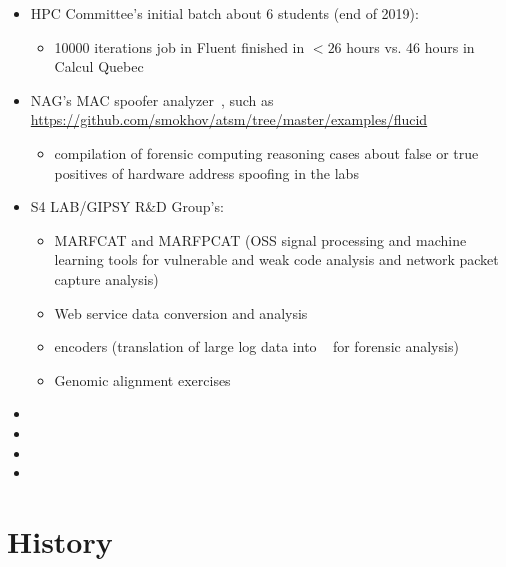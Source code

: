 \documentclass{easychair}
\begin{document}
\begin{itemize}
	\item 
HPC Committee's initial batch about 6 students (end of 2019):
\begin{itemize}
	\item 
10000 iterations job in Fluent finished in $<26$ hours vs. 46 hours in Calcul Quebec
\end{itemize}
	\item 
NAG's MAC spoofer analyzer~\cite{mac-spoofer-analyzer-intro-c3s2e2014,mac-spoofer-analyzer-detail-fps2014},
such as \url{https://github.com/smokhov/atsm/tree/master/examples/flucid}
\begin{itemize}
	\item 
compilation of forensic computing reasoning cases about false or true positives of hardware address spoofing in the labs
\end{itemize}
	\item 
S4 LAB/GIPSY R\&D Group's:
\begin{itemize}
	\item 
MARFCAT and MARFPCAT (OSS signal processing and machine learning tools for 
vulnerable and weak code analysis and network packet capture
analysis)~\cite{marfcat-nlp-ai2014,marfcat-sate2010-nist,fingerprinting-mal-traffic}
	\item 
Web service data conversion and analysis
	\item 
{\flucid} encoders (translation of large log data into {\flucid}~\cite{mokhov-phd-thesis-2013} for forensic analysis)
	\item 
Genomic alignment exercises
\end{itemize}
\item
{}
\item
{}
\item
{}
\item
{}
\end{itemize}

\appendix

\section{History}

\end{document}
